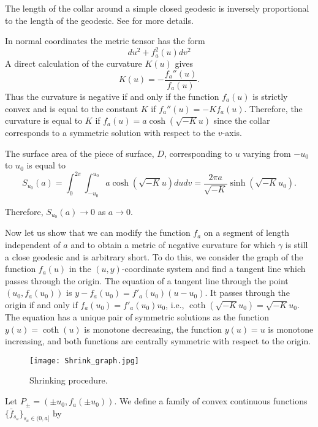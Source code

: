 \documentclass[12pt]{article}
\numberwithin{equation}{section}
\theoremstyle{definition}
\begin{document}
The length of the collar around a simple closed geodesic is inversely proportional to the length of the  geodesic. See \cite{B92} for more details.

In  normal coordinates the metric tensor has the form
\begin{equation*}
du^2+ f_a^2(u)dv^2
\end{equation*}
A direct calculation  of the curvature $K(u)$ gives
\begin{equation*}
K(u)= -\frac{f_a''(u)}{f_a(u)}.
\end{equation*}
Thus the curvature is negative if and only if the function $f_a(u)$ is strictly convex and is equal to the constant $K$ if $f_a''(u) = -Kf_a(u)$. Therefore, the curvature is equal to $K$ if  $f_a(u) = a\cosh (\sqrt{-K}u)$ since the collar corresponds to a symmetric solution with respect to the $v$-axis. %

The surface area of the piece of surface, $D$, corresponding to $u$ varying from $-u_0$ to $u_0$ is equal to
\begin{equation*}
S_{u_0}(a) = \int_0^{2\pi}\int_{-u_0}^{u_0} a\cosh (\sqrt{-K}u)dudv 
= \frac{2\pi a}{\sqrt{-K}} \sinh (\sqrt{-K}u_0).
\end{equation*}

Therefore, $S_{u_0}(a)\rightarrow 0$ as $a\rightarrow 0$.

Now let us show that we can modify the function $f_a$ on a segment of length independent of $a$ and to obtain a metric of negative curvature for which $\gamma$ is still a close geodesic and is  arbitrary short. To do this, we consider the graph of the function $f_a(u)$ in the $(u, y)$-coordinate system and find a tangent line which passes through the origin. The equation of a tangent line through the point $(u_0, f_a(u_0))$ is $y-f_a(u_0) = f'_a(u_0)(u-u_0).$ It passes through the origin if and only if $f_a(u_0) = f'_a(u_0)u_0$, i.e., $\coth(\sqrt{-K}u_0) = \sqrt{-K}u_0$. The equation has a unique pair of symmetric solutions as the function $y(u)=\coth(u)$ is monotone decreasing, the function $y(u)=u$ is monotone increasing, and both functions are centrally symmetric with respect to the origin.

     \begin{figure}
      \centering
      \texttt{[image: Shrink\_graph.jpg]}
      \caption{Shrinking procedure.}
      \label{shrink_gr}
      \end{figure}

Let $P_{\pm}= (\pm u_0, f_a(\pm u_0))$. We define a family of convex continuous functions $\{\bar f_{s_a}\}_{s_a\in(0,a]}$ by
\end{document}

